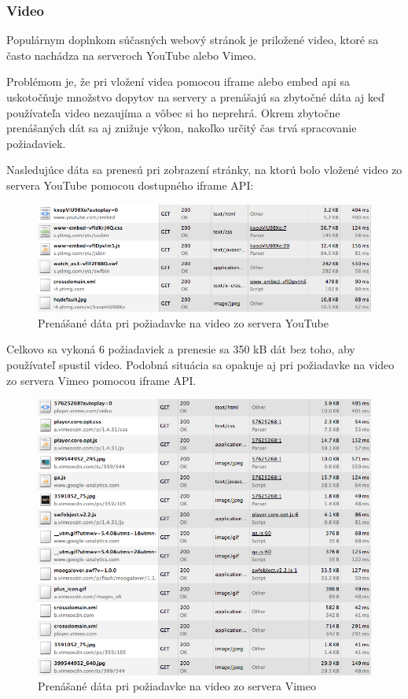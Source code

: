\subsubsection{Video} %
\label{subsub:video}

Populárnym doplnkom súčasných webový stránok je priložené video, ktoré sa často nachádza na serveroch YouTube alebo Vimeo.

Problémom je, že pri vložení videa pomocou iframe alebo embed api sa uskotočňuje množstvo dopytov na servery a prenášajú sa zbytočné dáta aj keď používateľa video nezaujíma a vôbec si ho neprehrá. Okrem zbytočne prenášaných dát sa aj znižuje výkon, nakoľko určitý čas trvá spracovanie požiadaviek.

Nasledujúce dáta sa prenesú pri zobrazení stránky, na ktorú bolo vložené video zo servera YouTube pomocou dostupného iframe API:

\begin{figure}[H]
	\centering
	\includegraphics[width=1.0\textwidth]{img/youtube.png}
	\caption[Prenášané dáta pri požiadavke na video zo servera YouTube]{
		Prenášané dáta pri požiadavke na video zo servera YouTube}
	\label{fig: youtube}
\end{figure}

Celkovo sa vykoná 6 požiadaviek a prenesie sa 350 kB dát bez toho, aby používateľ spustil video. Podobná situácia sa opakuje aj pri požiadavke na video zo servera Vimeo pomocou iframe API.

\newpage
\begin{figure}[H]
	\centering
	\includegraphics[width=1.0\textwidth]{img/vimeo.png}
	\caption[Prenášané dáta pri požiadavke na video zo servera Vimeo]{
		Prenášané dáta pri požiadavke na video zo servera Vimeo}
	\label{fig: vimeo}
\end{figure}

